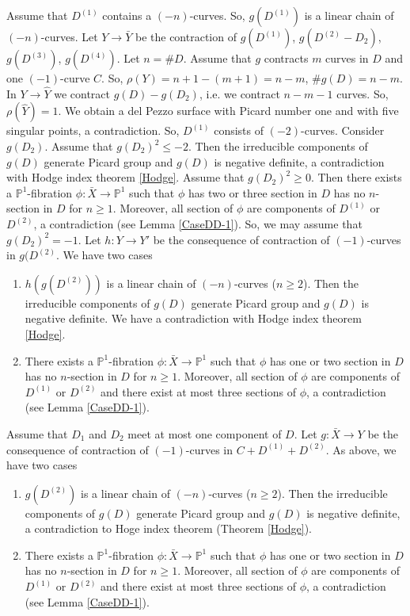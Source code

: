 \documentclass[10pt,oneside,reqno]{amsart}
\newcommand{\pp}{\mathbb{P}}
\theoremstyle{definition}
\theoremstyle{remark}
\numberwithin{equation}{section}
\begin{document}
Assume that $D^{(1)}$ contains a $(-n)$-curves. So, $g(D^{(1)})$ is a linear chain of $(-n)$-curves. Let $Y\rightarrow\bar{Y}$ be the contraction of $g(D^{(1)})$, $g(D^{(2)}-D_2)$, $g(D^{(3)})$, $g(D^{(4)})$. Let $n=\#D$. Assume that $g$ contracts $m$ curves in $D$ and one $(-1)$-curve $C$. So, $\rho(Y)=n+1-(m+1)=n-m$, $\#g(D)=n-m$. In $Y\rightarrow\hat{Y}$ we contract $g(D)-g(D_2)$, i.e. we contract $n-m-1$ curves. So, $\rho(\hat{Y})=1$. We obtain a del Pezzo surface with Picard number one and with five singular points, a contradiction.
So, $D^{(1)}$ consists of $(-2)$-curves. Consider $g(D_2)$. Assume that $g(D_2)^2\leq -2$. Then the irreducible components of $g(D)$ generate Picard group and $g(D)$ is negative definite, a contradiction with Hodge index theorem \ref{Hodge}. Assume that $g(D_2)^2\geq 0$. Then there exists a $\pp^1$-fibration $\phi\colon\bar{X}\rightarrow\pp^1$ such that $\phi$ has two or three section in $D$ has no $n$-section in $D$ for $n\geq 1$. Moreover, all section of $\phi$ are components of $D^{(1)}$ or $D^{(2)}$, a contradiction (see Lemma \ref{CaseDD-1}). So, we may assume that $g(D_2)^2=-1$. Let $h\colon Y\rightarrow Y'$ be the consequence of contraction of $(-1)$-curves in $g(D^{(2)}$. We have two cases
\begin{enumerate}
\item $h(g(D^{(2)}))$ is a linear chain of $(-n)$-curves ($n\geq 2$). Then the irreducible components of $g(D)$ generate Picard group and $g(D)$ is negative definite. We have a contradiction with Hodge index theorem \ref{Hodge}.
\item There exists a $\pp^1$-fibration $\phi\colon\bar{X}\rightarrow\pp^1$ such that $\phi$ has one or two section in $D$ has no $n$-section in $D$ for $n\geq 1$. Moreover, all section of $\phi$ are components of $D^{(1)}$ or $D^{(2)}$ and there exist at most three sections of $\phi$, a contradiction (see Lemma \ref{CaseDD-1}).
\end{enumerate}

Assume that $D_1$ and $D_2$ meet at most one component of $D$. Let $g\colon\bar{X}\rightarrow Y$ be the consequence of contraction of $(-1)$-curves in $C+D^{(1)}+D^{(2)}$. As above, we have two cases
\begin{enumerate}
\item $g(D^{(2)})$ is a linear chain of $(-n)$-curves ($n\geq 2$). Then the irreducible components of $g(D)$ generate Picard group and $g(D)$ is negative definite, a contradiction to Hoge index theorem (Theorem  \ref{Hodge}).
\item There exists a $\pp^1$-fibration $\phi\colon\bar{X}\rightarrow\pp^1$ such that $\phi$ has one or two section in $D$ has no $n$-section in $D$ for $n\geq 1$. Moreover, all section of $\phi$ are components of $D^{(1)}$ or $D^{(2)}$ and there exist at most three sections of $\phi$, a contradiction (see Lemma \ref{CaseDD-1}).
\end{enumerate}
\end{document}
